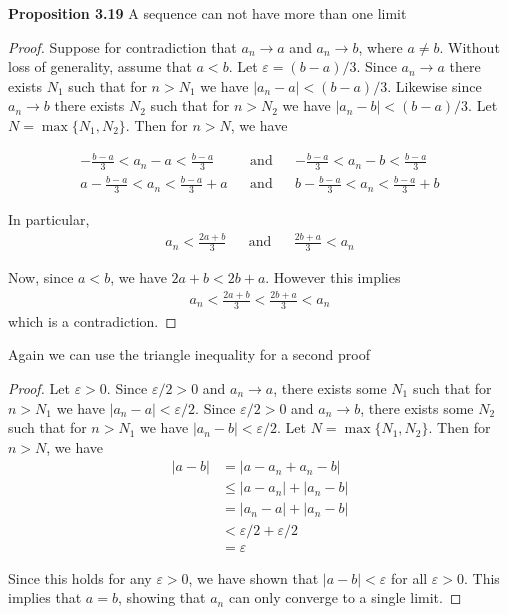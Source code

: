 \documentclass{article}
\begin{document}
\textbf{Proposition 3.19} A sequence can not have more than one limit
\begin{proof}
	Suppose for contradiction that $a_n \rightarrow a$ and $a_n \rightarrow b$, where $a \neq b$. Without loss of generality,
	assume that $a < b$. Let $\varepsilon = (b - a)/ 3$. Since $a_n \rightarrow a$ there exists $N_1$ such that for $n > N_1$ we have
	$|a_n - a| < (b - a)/ 3$. Likewise since $a_n \rightarrow b$ there exists $N_2$ such that for $n > N_2$ we have $|a_n - b| < (b - a)/ 3$.
	Let $N = \max\{N_1, N_2\}$. Then for $n > N$, we have

	\begin{align*}
		-\frac{b - a}{3} < a_n - a < \frac{b - a}{3}   &  & \text{and} &  & -\frac{b - a}{3} < a_n - b < \frac{b - a}{3}    \\
		a -\frac{b - a}{3} < a_n < \frac{b - a}{3} + a &  & \text{and} &  & b - \frac{b - a}{3} < a_n < \frac{b - a}{3} + b
	\end{align*}

	In particular,
	\begin{align*}
		a_n < \frac{2a + b}{3} &  & \text{and} &  & \frac{2b + a}{3} < a_n
	\end{align*}

	Now, since $a < b$, we have $2a + b < 2b + a$. However this implies
	\begin{align*}
		a_n < \frac{2a + b}{3} < \frac{2b + a}{3} < a_n
	\end{align*}
	which is a contradiction.
\end{proof}

Again we can use the triangle inequality for a second proof
\begin{proof}
	Let $\varepsilon > 0$. Since $\varepsilon/2 > 0$ and $a_n \rightarrow a$, there exists some $N_1$ such that for $n > N_1$
	we have $|a_n - a| < \varepsilon/2$. Since $\varepsilon/2 > 0$ and $a_n \rightarrow b$, there exists some $N_2$ such that for $n > N_1$
	we have $|a_n - b| < \varepsilon/2$. Let $N = \max\{N_1, N_2\}$. Then for $n > N$, we have
	\begin{align*}
		|a - b| & = |a - a_n + a_n - b|           \\
		        & \le |a - a_n| + |a_n - b|       \\
		        & = |a_n - a| + |a_n - b|         \\
		        & < \varepsilon/2 + \varepsilon/2 \\
		        & = \varepsilon
	\end{align*}

	Since this holds for any $\varepsilon > 0$, we have shown that $|a - b| < \varepsilon$ for all $\varepsilon > 0$. This implies that
	$a = b$, showing that $a_n$ can only converge to a single limit.
\end{proof}
\end{document}
